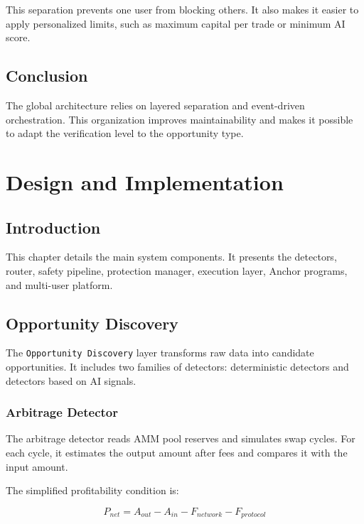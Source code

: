 \documentclass[12pt,a4paper]{report}
\begin{document}
This separation prevents one user from blocking others. It also makes it easier to apply personalized limits, such as maximum capital per trade or minimum AI score.

\section{Conclusion}

The global architecture relies on layered separation and event-driven orchestration. This organization improves maintainability and makes it possible to adapt the verification level to the opportunity type.

\chapter{Design and Implementation}
\label{chap:implementation}

\section{Introduction}

This chapter details the main system components. It presents the detectors, router, safety pipeline, protection manager, execution layer, Anchor programs, and multi-user platform.

\section{Opportunity Discovery}

The \texttt{Opportunity Discovery} layer transforms raw data into candidate opportunities. It includes two families of detectors: deterministic detectors and detectors based on AI signals.

\subsection{Arbitrage Detector}

The arbitrage detector reads AMM pool reserves and simulates swap cycles. For each cycle, it estimates the output amount after fees and compares it with the input amount.

The simplified profitability condition is:

\begin{equation}
    P_{net} = A_{out} - A_{in} - F_{network} - F_{protocol}
\end{equation}
\end{document}
